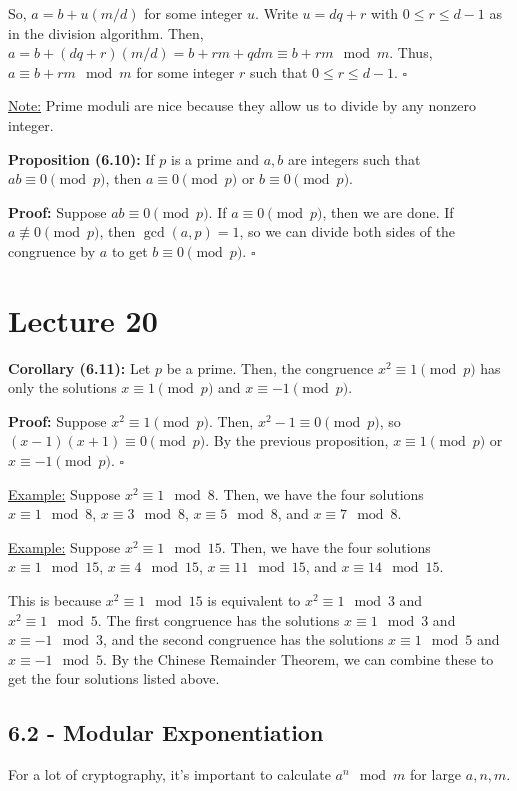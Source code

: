 \documentclass{article}
\newcommand*{\qed}{\hfill$\square$}%
\begin{document}
So, $a=b+u(m/d)$ for some integer $u$. Write $u=dq+r$ with $0\leq r\leq d-1$ as in the division algorithm. Then, $a=b+(dq+r)(m/d)=b+rm+qdm\equiv b+rm\mod m$. Thus, $a\equiv b+rm\mod m$ for some integer $r$ such that $0\leq r\leq d-1$. \qed

\underline{Note:} Prime moduli are nice because they allow us to divide by any nonzero integer.

\textbf{Proposition (6.10):} If $p$ is a prime and $a,b$ are integers such that $ab\equiv 0\pmod p$, then $a\equiv 0\pmod p$ or $b\equiv 0\pmod p$.

\textbf{Proof:} Suppose $ab\equiv 0\pmod p$. If $a\equiv 0\pmod p$, then we are done. If $a\not\equiv 0\pmod p$, then $\gcd(a,p)=1$, so we can divide both sides of the congruence by $a$ to get $b\equiv 0\pmod p$. \qed

\section{Lecture 20}

\textbf{Corollary (6.11):} Let $p$ be a prime. Then, the congruence $x^2\equiv 1\pmod p$ has only the solutions $x\equiv 1\pmod p$ and $x\equiv -1\pmod p$.

\textbf{Proof:} Suppose $x^2\equiv 1\pmod p$. Then, $x^2-1\equiv 0\pmod p$, so $(x-1)(x+1)\equiv 0\pmod p$. By the previous proposition, $x\equiv 1\pmod p$ or $x\equiv -1\pmod p$. \qed

\underline{Example:} Suppose $x^2\equiv 1\mod 8$. Then, we have the four solutions $x\equiv 1\mod 8$, $x\equiv 3\mod 8$, $x\equiv 5\mod 8$, and $x\equiv 7\mod 8$.

\underline{Example:} Suppose $x^2\equiv 1\mod 15$. Then, we have the four solutions $x\equiv 1\mod 15$, $x\equiv 4\mod 15$, $x\equiv 11\mod 15$, and $x\equiv 14\mod 15$.

This is because $x^2\equiv 1\mod 15$ is equivalent to $x^2\equiv 1\mod 3$ and $x^2\equiv 1\mod 5$. The first congruence has the solutions $x\equiv 1\mod 3$ and $x\equiv -1\mod 3$, and the second congruence has the solutions $x\equiv 1\mod 5$ and $x\equiv -1\mod 5$. By the Chinese Remainder Theorem, we can combine these to get the four solutions listed above.

\subsection{6.2 - Modular Exponentiation}

For a lot of cryptography, it's important to calculate $a^n\mod m$ for large $a,n,m$. 
\end{document}
